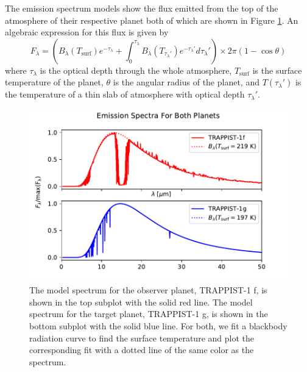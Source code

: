 \documentclass{knac}
\begin{document}
The emission spectrum models show the flux emitted from the top of the atmosphere of their respective planet both of which are shown in Figure \ref{figure:emission_spectra}. An algebraic expression for this flux is given by 
\begin{equation}
F_\lambda = \left(B_{\lambda}(T_\mathrm{surf})e^{-\tau_\lambda} + \int_{0}^{\tau_\lambda} B_\lambda (T_{\tau_{\lambda}'})e^{-\tau_{\lambda}'}d\tau_{\lambda}' \right)\times 2\pi\left(1 - \cos{\theta}\right)
\label{equation:f_lambda}
\end{equation} where $\tau_\lambda$ is the optical depth through the whole atmosphere, $T_\mathrm{surf}$ is the surface temperature of the planet, $\theta$ is the angular radius of the planet, and $T(\tau_{\lambda}')$ is the temperature of a thin slab of atmosphere with optical depth $\tau_{\lambda}'$.


\begin{figure}[bht]
\centering
\includegraphics[angle=0,scale=0.82]{emission_both.pdf}
\caption{The model spectrum for the observer planet, TRAPPIST-1 f, is shown in the top subplot with the solid red line. The model spectrum for the target planet, TRAPPIST-1 g, is shown in the bottom subplot with the solid blue line. For both, we fit a blackbody radiation curve to find the surface temperature and plot the corresponding fit with a dotted line of the same color as the spectrum.}
\label{figure:emission_spectra}
\end{figure}
\end{document}
